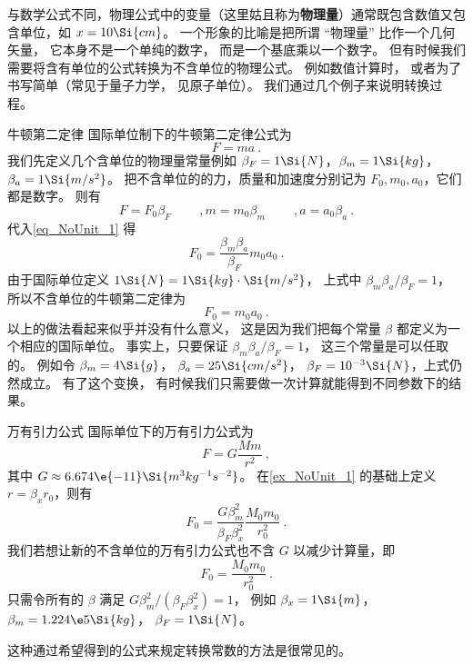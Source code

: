 

与数学公式不同，物理公式中的变量（这里姑且称为\textbf{物理量}）通常既包含数值又包含单位，如 $x = 10\Si{cm}$。 一个形象的比喻是把所谓 “物理量” 比作一个几何矢量， 它本身不是一个单纯的数字， 而是一个基底乘以一个数字。 但有时候我们需要将含有单位的公式转换为不含单位的物理公式。 例如数值计算时， 或者为了书写简单（常见于量子力学， 见原子单位）。 我们通过几个例子来说明转换过程。

\begin{example}{牛顿第二定律}\label{ex_NoUnit_1}
国际单位制下的牛顿第二定律公式为
\begin{equation}\label{eq_NoUnit_1}
F = ma~.
\end{equation}
我们先定义几个含单位的物理量常量例如 $\beta_{F} = 1\Si{N}$，$\beta_{m} = 1\Si{kg}$，$\beta_{a} = 1\Si{m/s^2}$。 把不含单位的的力，质量和加速度分别记为 $F_0, m_0, a_0$，它们都是数字。 则有
\begin{equation}
F = F_0 \beta_F \qquad~,
m = m_0 \beta_{m} \qquad~,
a = a_0 \beta_{a}~.
\end{equation}
代入\autoref{eq_NoUnit_1} 得
\begin{equation}
F_0 = \frac{\beta_m \beta_a}{\beta_F} m_0  a_0~.
\end{equation}
由于国际单位定义 $1\Si{N} = 1\Si{kg}\cdot\Si{m/s^2}$， 上式中 $\beta_m \beta_a/\beta_F = 1$， 所以不含单位的牛顿第二定律为
\begin{equation}\label{eq_NoUnit_3}
F_0 = m_0 a_0~.
\end{equation}
以上的做法看起来似乎并没有什么意义， 这是因为我们把每个常量 $\beta$ 都定义为一个相应的国际单位。 事实上，只要保证 $\beta_m \beta_a/\beta_F = 1$， 这三个常量是可以任取的。 例如令 $\beta_m = 4\Si{g}$， $\beta_a = 25\Si{cm/s^2}$， $\beta_F = 10^{-3}\Si{N}$，上式仍然成立。 有了这个变换， 有时候我们只需要做一次计算就能得到不同参数下的结果。
\end{example}

\begin{example}{万有引力公式}\label{ex_NoUnit_2}
国际单位下的万有引力公式为
\begin{equation}
F = G\frac{Mm}{r^2}~,
\end{equation}
其中 $G \approx 6.674\e{-11} \Si{m^3 kg^{-1} s^{-2}}$。 在\autoref{ex_NoUnit_1} 的基础上定义 $r = \beta_x r_0$，则有
\begin{equation}
F_0 = \frac{G\beta_m^2}{\beta_F \beta_x^2} \frac{M_0 m_0}{r_0^2}~.
\end{equation}
我们若想让新的不含单位的万有引力公式也不含 $G$ 以减少计算量，即
\begin{equation}\label{eq_NoUnit_6}
F_0 = \frac{M_0 m_0}{r_0^2}~.
\end{equation}
只需令所有的 $\beta$ 满足 $G\beta_m^2/(\beta_F\beta_x^2) = 1$， 例如 $\beta_x = 1\Si{m}$， $\beta_m = 1.224\e5 \Si{kg}$， $\beta_F = 1\Si{N}$。
\end{example}
这种通过希望得到的公式来规定转换常数的方法是很常见的。

